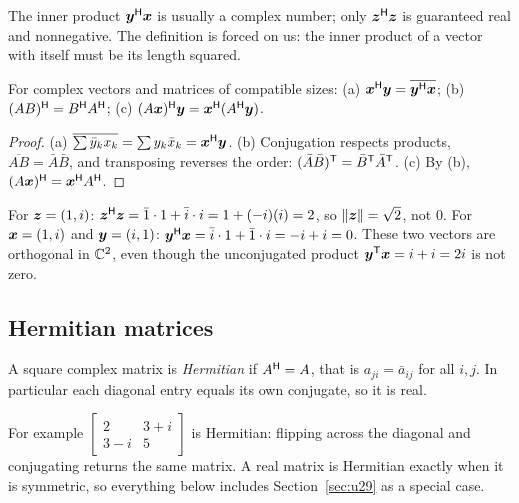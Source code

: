 The inner product $\boldsymbol{y}^{\mathsf{H}}\boldsymbol{x}$ is usually a complex number; only $\boldsymbol{z}^{\mathsf{H}}\boldsymbol{z}$ is guaranteed real
and nonnegative. The definition is forced on us: the inner product of a vector with itself
must be its length squared.

\begin{proposition}\label{prop:u30-rules}
For complex vectors and matrices of compatible sizes:
(a) $\boldsymbol{x}^{\mathsf{H}}\boldsymbol{y}=\overline{\boldsymbol{y}^{\mathsf{H}}\boldsymbol{x}}$;
(b) $(AB)^{\mathsf{H}}=B^{\mathsf{H}} A^{\mathsf{H}}$;
(c) $(A\boldsymbol{x})^{\mathsf{H}}\boldsymbol{y}=\boldsymbol{x}^{\mathsf{H}}(A^{\mathsf{H}}\boldsymbol{y})$.
\end{proposition}
\begin{proof}
(a) $\overline{\sum\bar y_kx_k}=\sum y_k\bar x_k=\boldsymbol{x}^{\mathsf{H}}\boldsymbol{y}$.
(b) Conjugation respects products, $\overline{AB}=\bar A\bar B$, and transposing reverses the
order: $(\bar A\bar B)^{\mathsf{T}}=\bar B^{\mathsf{T}}\bar A^{\mathsf{T}}$.
(c) By (b), $(A\boldsymbol{x})^{\mathsf{H}}=\boldsymbol{x}^{\mathsf{H}} A^{\mathsf{H}}$.
\end{proof}

\begin{example}\label{ex:u30-c2}
For $\boldsymbol{z}=(1,i)$: $\boldsymbol{z}^{\mathsf{H}}\boldsymbol{z}=\bar1\cdot1+\bar i\cdot i=1+(-i)(i)=2$, so $\|\boldsymbol{z}\|=\sqrt2$, not $0$.
For $\boldsymbol{x}=(1,i)$ and $\boldsymbol{y}=(i,1)$: $\boldsymbol{y}^{\mathsf{H}}\boldsymbol{x}=\bar i\cdot1+\bar1\cdot i=-i+i=0$. These two vectors
are orthogonal in $\mathbb{C}^2$, even though the unconjugated product $\boldsymbol{y}^{\mathsf{T}}\boldsymbol{x}=i+i=2i$ is not zero.
\end{example}

\subsection{Hermitian matrices}

\begin{definition}\label{def:u30-hermitian}
A square complex matrix is \emph{Hermitian} if $A^{\mathsf{H}}=A$, that is $a_{ji}=\bar a_{ij}$ for all
$i,j$. In particular each diagonal entry equals its own conjugate, so it is real.
\end{definition}

For example $\begin{bmatrix}2&3+i\\3-i&5\end{bmatrix}$ is Hermitian: flipping across the
diagonal and conjugating returns the same matrix. A real matrix is Hermitian exactly when it is
symmetric, so everything below includes Section~\ref{sec:u29} as a special case.

